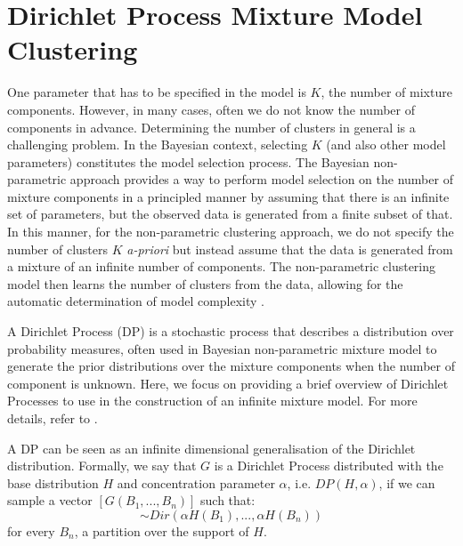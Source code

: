 \section{Dirichlet Process Mixture Model Clustering\label{background-dp-clustering}}

One parameter that has to be specified in the model is $K$, the number of mixture components. However, in many cases, often we do not know the number of components in advance. Determining the number of clusters in general is a challenging problem. In the Bayesian context, selecting $K$ (and also other model parameters) constitutes the model selection process. The Bayesian non-parametric approach provides a way to perform model selection on the number of mixture components in a principled manner by assuming that there is an infinite set of parameters, but the observed data is generated from a finite subset of that. In this manner, for the non-parametric clustering approach, we do not specify the number of clusters $K$ \emph{a-priori } but instead assume that the data is generated from a mixture of an infinite number of components. The non-parametric clustering model then learns the number of clusters from the data, allowing for the automatic determination of model complexity \cite{hjort2010bayesian}.

A Dirichlet Process (DP) \cite{ferguson1973bayesian} is a stochastic process that describes a distribution over probability measures, often used in Bayesian non-parametric mixture model to generate the prior distributions over the mixture components when the number of component is unknown. Here, we focus on providing a brief overview of Dirichlet Processes to use in the construction of an infinite mixture model. For more details, refer to \cite{murphy2012machine, Rasmussen2000, hjort2010bayesian,teh2011dirichlet}. 

A DP can be seen as an infinite dimensional generalisation of the Dirichlet distribution. Formally, we say that $G$ is a Dirichlet Process distributed with the base distribution $H$ and concentration parameter $\alpha$, i.e. $DP(H, \alpha)$, if we can sample a vector $[G(B_1, ..., B_n)]$ such that:
\begin{equation}
[G(B_1, ..., B_n)] \sim Dir(\alpha H(B_1), ..., \alpha H(B_n))
\label{eq:background-dp-definition}
\end{equation}
for every $B_n$, a partition over the support of $H$.

